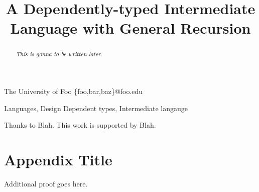 \documentclass[preprint]{sigplanconf}
\theoremstyle{break}
\begin{document}
\setlength{\pdfpageheight}{\paperheight}
\setlength{\pdfpagewidth}{\paperwidth}


\preprintfooter{} %

\title{A Dependently-typed Intermediate Language with General Recursion}
\subtitle{}

           {The University of Foo}
           {\{foo,bar,baz\}@foo.edu}

\maketitle

\begin{abstract}
\emph{This is gonna to be written later.}
\end{abstract}

\terms Languages, Design
\keywords Dependent types, Intermediate langauge

















\acks
Thanks to Blah. This work is supported by Blah.


\nocite{*}



\appendix
\section{Appendix Title}
Additional proof goes here.

\end{document}
